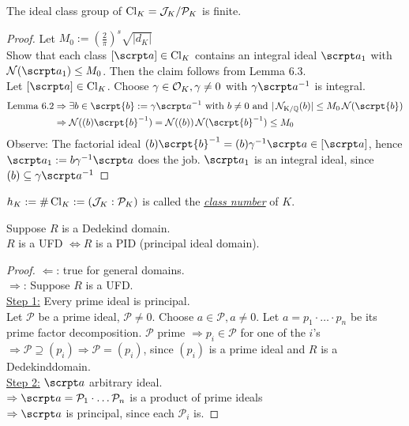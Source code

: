 \begin{Satz}[Finiteness of $\Cl_K$]
The ideal class group of $\operatorname{Cl}_K=\mathcal{J}_K/\mathcal{P}_K$ is finite.
\end{Satz}

\begin{proof}
Let $M_0:= (\frac{2}{\pi})^s \sqrt{|d_K|}$\\
Show that each class $[\a] \in \Cl_K$ contains an integral ideal $\a_1$ with $\Norm(\a_1) \leq M_0$. Then the claim follows from Lemma 6.3.\\
Let $[\a] \in \Cl_K$. Choose $\gamma \in \mathcal{O}_K, \gamma \neq 0$ with $\gamma \a^{-1}$ is integral.
\begin{align*}
\text{Lemma 6.2} &\Rightarrow \exists b \in \scrpt{b}:= \gamma \a^{-1} \text{ with } b \neq 0 \text{ and } |\NormKQ(b)| \leq M_0 \Norm(\scrpt{b})\\
&\Rightarrow \Norm((b)\scrpt{b}^{-1})=\Norm((b))\Norm(\scrpt{b}^{-1}) \leq M_0
\end{align*}
Observe: The factorial ideal $(b) \scrpt{b}^{-1} = (b) \gamma^{-1} \a \in [\a]$, hence $\a_1:=b\gamma^{-1}\a$ does the job. $\a_1$ is an integral ideal, since $(b) \subseteq \gamma \a^{-1}$
\end{proof}

\begin{defi}
$h_K:= \# \operatorname{Cl}_K:= (\mathcal{J}_K : \mathcal{P}_K)$ is called the \underline{\emph{class number}} of $K$.
\end{defi}

\begin{Prop}
Suppose $R$ is a Dedekind domain.\\
$R$ is a UFD $\iff R$ is a PID (principal ideal domain).
\end{Prop}

\begin{proof}
\glqq $\Leftarrow$\grqq: true for general domains.\\
\glqq $\Rightarrow$\grqq: Suppose $R$ is a UFD.\\
\underline{Step 1:} Every prime ideal is principal.\\
Let $\mathcal{P}$ be a prime ideal, $\mathcal{P} \neq 0$. Choose $a \in \mathcal{P}, a \neq 0$. Let $a= p_1 \cdot \dots \cdot p_n$ be its prime factor decomposition. $\mathcal{P}$ prime $\Rightarrow p_i \in \mathcal{P}$ for one of the $i$'s $\Rightarrow \mathcal{P} \supseteq (p_i) \Rightarrow \mathcal{P} = (p_i)$, since $(p_i)$ is a prime ideal and $R$ is a Dedekinddomain.\\
\underline{Step 2:} $\a$ arbitrary ideal.\\
$\Rightarrow \a = \mathcal{P}_1 \cdot \dots \mathcal{P}_n$ is a product of prime ideals\\
$\Rightarrow \a$ is principal, since each $\mathcal{P}_i$ is.
\end{proof}

